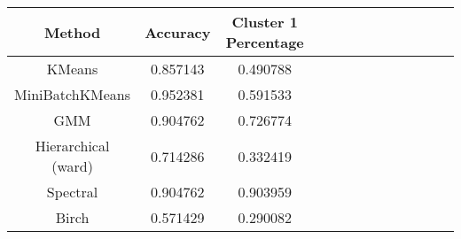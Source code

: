 \begin{tabular}{ccccccccccccc}
\toprule
             Method &  Accuracy &  Cluster 1 Percentage \\
\midrule
             KMeans &  0.857143 &              0.490788 \\
    MiniBatchKMeans &  0.952381 &              0.591533 \\
                GMM &  0.904762 &              0.726774 \\
Hierarchical (ward) &  0.714286 &              0.332419 \\
           Spectral &  0.904762 &              0.903959 \\
              Birch &  0.571429 &              0.290082 \\
\bottomrule
\end{tabular}
